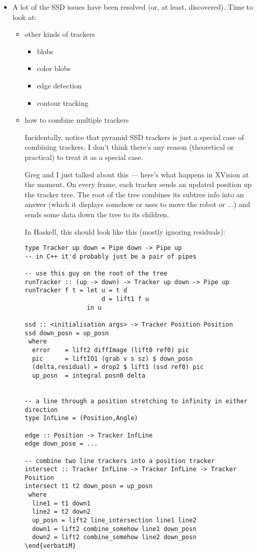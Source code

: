 \begin{itemize}
\item
A lot of the SSD issues have been resolved (or, at least, discovered).
Time to look at:
\begin{itemize}
\item other kinds of trackers 
\begin{itemize}
\item blobs
\item color blobs
\item edge detection
\item contour tracking
\end{itemize}

\item how to combine multiple trackers

Incidentally, notice that pyramid SSD trackers is just a special case
of combining trackers.  I don't think there's any reason (theoretical
or practical) to treat it as a special case.

Greg and I just talked about this --- here's what happens in XVision
at the moment.  On every frame, each tracker sends an updated position
up the tracker tree.  The root of the tree combines its subtree info
into an answer (which it displays somehow or uses to move the robot or
...)  and sends some data down the tree to its children.

In Haskell, this should look like this (mostly ignoring residuals):
\begin{verbatim}
type Tracker up down = Pipe down -> Pipe up
-- in C++ it'd probably just be a pair of pipes

-- use this guy on the root of the tree
runTracker :: (up -> down) -> Tracker up down -> Pipe up
runTracker f t = let u = t d
                     d = lift1 f u
                 in u

ssd :: <initialisation args> -> Tracker Position Position
ssd down_posn = up_posn
 where
  error    = lift2 diffImage (lift0 ref0) pic
  pic      = liftIO1 (grab v s sz) $ down_posn
  (delta,residual) = drop2 $ lift1 (ssd ref0) pic
  up_posn  = integral posn0 delta
  

-- a line through a position stretching to infinity in either direction
type InfLine = (Position,Angle)

edge :: Position -> Tracker InfLine
edge down_pose = ...

-- combine two line trackers into a position tracker
intersect :: Tracker InfLine -> Tracker InfLine -> Tracker Position
intersect t1 t2 down_posn = up_posn
 where
  line1 = t1 down1
  line2 = t2 down2
  up_posn = lift2 line_intersection line1 line2
  down1 = lift2 combine_somehow line1 down_posn
  down2 = lift2 combine_somehow line2 down_posn
\end{verbatiM}


\end{verbatim}
\end{itemize}
\end{itemize}
